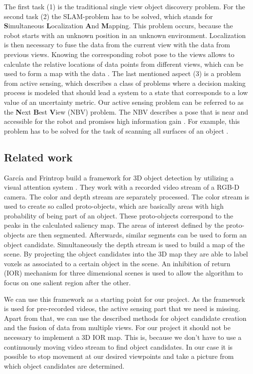 \documentclass[a4paper,11pt,english]{article}
\begin{document}
The first task (1) is the traditional single view object discovery problem. For the second task (2) the SLAM-problem has to be solved, which stands for \textbf{S}imultaneous \textbf{L}ocalization \textbf{A}nd \textbf{M}apping. This problem occurs, because the robot starts with an unknown position in an unknown environment. Localization is then necessary to fuse the data from the current view with the data from previous views. Knowing the corresponding robot pose to the views allows to calculate the relative locations of data points from different views, which can be used to form a map with the data \cite{surmann2003autonomous}. 
The last mentioned aspect (3) is a problem from active sensing, which describes a class of problems where a decision making process is modeled that should lead a system to a state that corresponds to a low value of an uncertainty metric.
Our active sensing problem can be referred to as the \textbf{N}ext \textbf{B}est \textbf{V}iew (NBV) problem.
The NBV describes a pose that is near and accessible for the robot and promises high information gain \cite{surmann2003autonomous}.
For example, this problem has to be solved for the task of scanning all surfaces of an object \cite{pito1999solution}.

\subsection{Related work}
García and Frintrop build a framework for 3D object detection by utilizing a visual attention system \cite{garcia2013computational}.
They work with a recorded video stream of a RGB-D camera. The color and depth stream are separately processed. 
The color stream is used to create so called proto-objects, which are basically areas with high probability of being part of an object. These proto-objects correspond to the peaks in the calculated saliency map. 
The areas of interest defined by the proto-objects are then segmented.
Afterwards, similar segments can be used to form an object candidate.
Simultaneously the depth stream is used to build a map of the scene.
By projecting the object candidates into the 3D map they are able to label voxels as associated to a certain object in the scene.
An inhibition of return (IOR) mechanism for three dimensional scenes is used to allow the algorithm to focus on one salient region after the other.

We can use this framework as a starting point for our project.
As the framework is used for pre-recorded videos, the active sensing part that we need is missing.
Apart from that, we can use the described methods for object candidate creation and the fusion of data from multiple views.
For our project it should not be necessary to implement a 3D IOR map. This is, because we don't have to use a continuously moving video stream to find object candidates. In our case it is possible to stop movement at our desired viewpoints and take a picture from which object candidates are determined. \medskip
\end{document}
